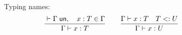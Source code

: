 \begin{figure}[h!]
  Typing names:\hfill{}
    \begin{gather*}
      \frac{\algprocin{}{\Gamma\;\unk,\quad x : T \in \Gamma}}
           {\algprocin{\Gamma}{x : T}}\qquad
      \frac{\algprocin{\Gamma}{x : T}\quad \isSubType{T}{U}}
           {\algprocin{\Gamma}{x : U}}
%
    \end{gather*}
\end{figure}


